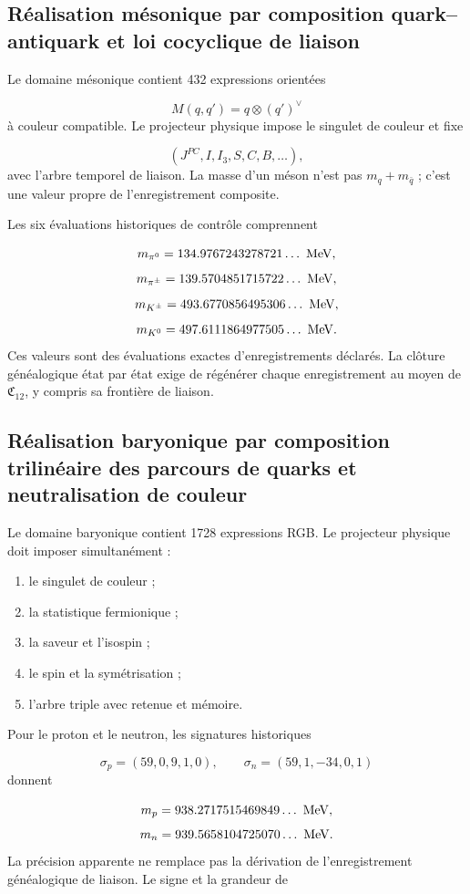 \subsection{Réalisation mésonique par composition quark–antiquark et loi cocyclique de liaison}
Le domaine mésonique contient 432 expressions orientées

\[
 M(q,q')=q\otimes(q')^\vee
\]
à couleur compatible. Le projecteur physique impose le singulet de couleur et fixe

\[
 (J^{PC},I,I_3,S,C,B,\ldots),
\]
avec l'arbre temporel de liaison. La masse d'un méson n'est pas \(m_q+m_{\bar q}\) ; c'est une valeur propre de l'enregistrement composite.

Les six évaluations historiques de contrôle comprennent

\[
 m_{\pi^0}=134.9767243278721\ldots\ {\rm MeV},
\]
\[
 m_{\pi^\pm}=139.5704851715722\ldots\ {\rm MeV},
\]
\[
 m_{K^\pm}=493.6770856495306\ldots\ {\rm MeV},
\]
\[
 m_{K^0}=497.6111864977505\ldots\ {\rm MeV}.
\]
Ces valeurs sont des évaluations exactes d'enregistrements déclarés. La clôture généalogique état par état exige de régénérer chaque enregistrement au moyen de \(\mathfrak C_{12}\), y compris sa frontière de liaison.

\subsection{Réalisation baryonique par composition trilinéaire des parcours de quarks et neutralisation de couleur}
Le domaine baryonique contient 1728 expressions RGB. Le projecteur physique doit imposer simultanément :

\begin{enumerate}
\item le singulet de couleur ;
\item la statistique fermionique ;
\item la saveur et l'isospin ;
\item le spin et la symétrisation ;
\item l'arbre triple avec retenue et mémoire.
\end{enumerate}
Pour le proton et le neutron, les signatures historiques

\[
 \sigma_p=(59,0,9,1,0),\qquad
 \sigma_n=(59,1,-34,0,1)
\]
donnent

\[
 m_p=938.2717515469849\ldots\ {\rm MeV},
\]
\[
 m_n=939.5658104725070\ldots\ {\rm MeV}.
\]
La précision apparente ne remplace pas la dérivation de l'enregistrement généalogique de liaison. Le signe et la grandeur de

